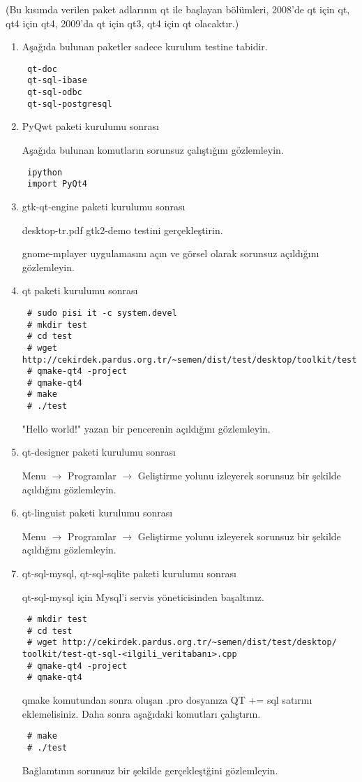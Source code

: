 \documentclass[a4paper,10pt]{article}
\begin{document}
(Bu kısımda verilen paket adlarının qt ile başlayan bölümleri, 2008'de qt için qt, qt4 için qt4, 2009'da qt için qt3, qt4 için qt olacaktır.)
\begin{enumerate}
 \item Aşağıda bulunan paketler sadece kurulum testine tabidir.
\begin{verbatim}
 qt-doc
 qt-sql-ibase
 qt-sql-odbc
 qt-sql-postgresql
\end{verbatim}
\item PyQwt paketi kurulumu sonrası

Aşağıda bulunan komutların sorunsuz çalıştığını gözlemleyin.
\begin{verbatim}
 ipython
 import PyQt4
\end{verbatim}

\item gtk-qt-engine paketi kurulumu sonrası

desktop-tr.pdf gtk2-demo testini gerçekleştirin.

gnome-mplayer uygulamasını açın ve görsel olarak sorunsuz açıldığını gözlemleyin.

 \item qt paketi kurulumu sonrası

\begin{verbatim}
 # sudo pisi it -c system.devel
 # mkdir test
 # cd test
 # wget http://cekirdek.pardus.org.tr/~semen/dist/test/desktop/toolkit/test.cpp
 # qmake-qt4 -project
 # qmake-qt4
 # make
 # ./test
\end{verbatim}

"Hello world!" yazan bir pencerenin açıldığını gözlemleyin.
\item qt-designer paketi kurulumu sonrası

Menu $\rightarrow$ Programlar $\rightarrow$ Geliştirme yolunu izleyerek sorunsuz bir şekilde açıldığını gözlemleyin.

\item qt-linguist paketi kurulumu sonrası

Menu $\rightarrow$ Programlar $\rightarrow$ Geliştirme yolunu izleyerek sorunsuz bir şekilde açıldığını gözlemleyin.

\item qt-sql-mysql, qt-sql-sqlite paketi kurulumu sonrası

qt-sql-mysql için Mysql'i servis yöneticisinden başaltınız.
\begin{verbatim}
 # mkdir test
 # cd test
 # wget http://cekirdek.pardus.org.tr/~semen/dist/test/desktop/ 
toolkit/test-qt-sql-<ilgili_veritabanı>.cpp
 # qmake-qt4 -project
 # qmake-qt4	
\end{verbatim}
qmake komutundan sonra oluşan .pro dosyanıza QT += sql satırını eklemelisiniz. Daha sonra aşağıdaki komutları çalıştırın.
\begin{verbatim}
 # make
 # ./test
\end{verbatim}

Bağlamtının sorunsuz bir şekilde gerçekleştğini gözlemleyin.

\end{enumerate}
\end{document}
